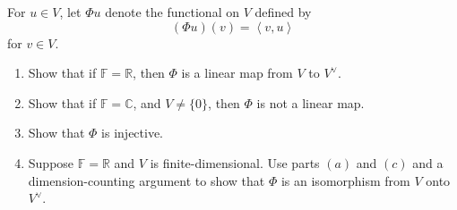 \documentclass[12pt, letterpaper]{hmcpset}
\begin{document}
\begin{problem}[17.]
	For $u \in V$, let $\Phi u$ denote the functional on $V$ defined by
	\[
		(\Phi u)(v) = \left < v, u \right >
	\]
	for $v \in V$.
	\begin{enumerate}
		\item
			Show that if $\mathbb F = \mathbb R$, then $\Phi$ is a linear map from $V$ to $V^{\vee}$.
		\item
			Show that if $\mathbb F = \mathbb C$, and $V \neq \{ 0 \}$, then $\Phi$ is not a linear map.
		\item
			Show that $\Phi$ is injective.
		\item
			Suppose $\mathbb F = \mathbb R$ and $V$ is finite-dimensional. Use parts $(a)$ and $(c)$ and a dimension-counting argument to show that $\Phi$ is an isomorphism from $V$ onto $V^{\vee}$.
	\end{enumerate}
\end{problem}
\end{document}
